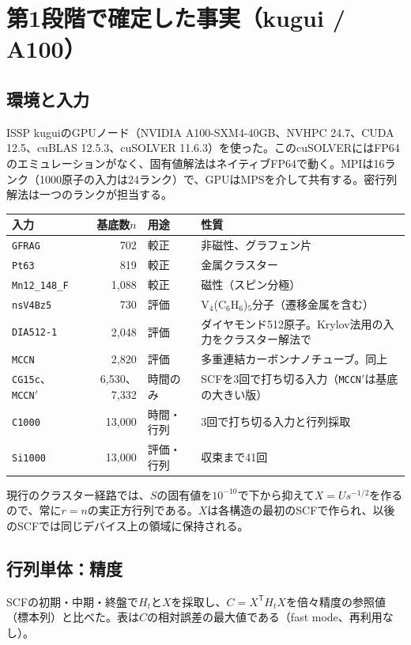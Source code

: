\documentclass[a4paper,11pt]{ltjsarticle}
\newcommand{\code}[1]{\texttt{#1}}
\begin{document}
\section{第1段階で確定した事実（kugui / A100）}\label{sec:facts}
\subsection{環境と入力}
ISSP kuguiのGPUノード（NVIDIA A100-SXM4-40GB、NVHPC 24.7、CUDA 12.5、cuBLAS 12.5.3、cuSOLVER 11.6.3）を使った。このcuSOLVERにはFP64のエミュレーションがなく、固有値解法はネイティブFP64で動く。MPIは16ランク（1000原子の入力は24ランク）で、GPUはMPSを介して共有する。密行列解法は一つのランクが担当する。

\noindent\begin{tabularx}{\linewidth}{@{}p{26mm}rp{22mm}Y@{}}
\toprule
入力 & 基底数$n$ & 用途 & 性質\\
\midrule
\code{GFRAG} & 702 & 較正 & 非磁性、グラフェン片\\
\code{Pt63} & 819 & 較正 & 金属クラスター\\
\code{Mn12\_148\_F} & 1,088 & 較正 & 磁性（スピン分極）\\
\code{nsV4Bz5} & 730 & 評価 & V$_4$(C$_6$H$_6$)$_5$分子（遷移金属を含む）\\
\code{DIA512-1} & 2,048 & 評価 & ダイヤモンド512原子。Krylov法用の入力をクラスター解法で\\
\code{MCCN} & 2,820 & 評価 & 多重連結カーボンナノチューブ。同上\\
\code{CG15c}、\code{MCCN}$'$ & 6,530、7,332 & 時間のみ & SCFを3回で打ち切る入力（\code{MCCN}$'$は基底の大きい版）\\
\code{C1000} & 13,000 & 時間・行列 & 3回で打ち切る入力と行列採取\\
\code{Si1000} & 13,000 & 評価・行列 & 収束まで41回\\
\bottomrule
\end{tabularx}

\medskip
現行のクラスター経路では、$S$の固有値を$10^{-10}$で下から抑えて$X=Us^{-1/2}$を作るので、常に$r=n$の実正方行列である。$X$は各構造の最初のSCFで作られ、以後のSCFでは同じデバイス上の領域に保持される。

\subsection{行列単体：精度}
SCFの初期・中期・終盤で$H_t$と$X$を採取し、$C=X^{\mathsf T}H_tX$を倍々精度の参照値（標本列）と比べた。表は$C$の相対誤差の最大値である（fast mode、再利用なし）。
\end{document}
